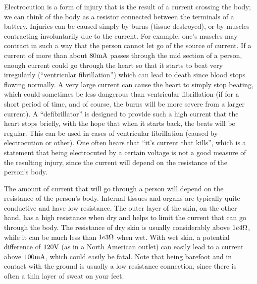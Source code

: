 Electrocution is a form of injury that is the result of a current crossing the body; we can think of the body as a resistor connected between the terminals of a battery. Injuries can be caused simply by burns (tissue destroyed), or by muscles contracting involuntarily due to the current. For example, one's muscles may contract in such a way that the person cannot let go of the source of current. If a current of more than about $80 {\rm mA}$ passes through the mid section of a person, enough current could go through the heart so that it starts to beat very irregularly (``ventricular fibrillation'') which can lead to death since blood stops flowing normally. A very large current can cause the heart to simply stop beating, which could sometimes be less dangerous than ventricular fibrillation (if for a short period of time, and of course, the burns will be more severe from a larger current). A ``defibrillator'' is designed to provide such a high current that the heart stops briefly, with the hope that when it starts back, the beats will be regular. This can be used in cases of ventricular fibrillation (caused by electrocution or other). One often hears that ``it's current that kills'', which is a statement that being electrocuted by a certain voltage is not a good measure of the resulting injury, since the current will depend on the resistance of the person's body.

The amount of current that will go through a person will depend on the resistance of the person's body. Internal tissues and organs are typically quite conductive and have low resistance. The outer layer of the skin, on the other hand, has a high resistance when dry and helps to limit the current that can go through the body. The resistance of dry skin is usually considerably above $1e4 {\rm \Omega}$, while it can be much less than $1e3 {\rm \Omega}$ when wet. With wet skin, a potential difference of $120 {\rm V}$ (as in a North American outlet) can easily lead to a current above $100 {\rm mA}$, which could easily be fatal. Note that being barefoot and in contact with the ground is usually a low resistance connection, since there is often a thin layer of sweat on your feet.

